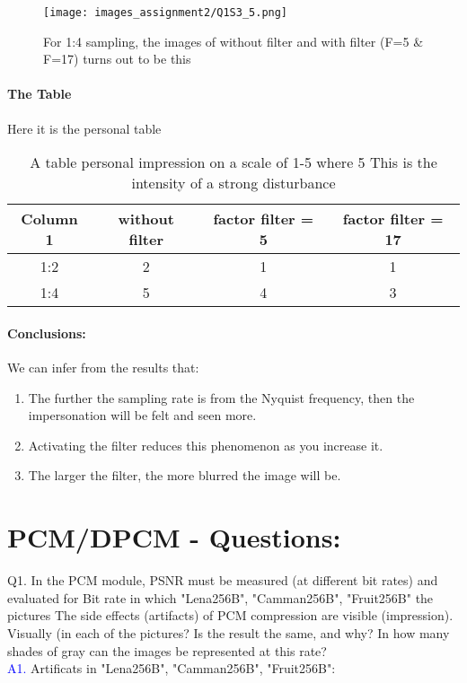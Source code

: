\documentclass[letterpaper, 12pt]{article}
\begin{document}
\begin{figure}[htb]
    \centering
    \texttt{[image: images\_assignment2/Q1S3\_5.png]}
    \caption{For 1:4 sampling, the images of without filter and with filter (F=5 \& F=17) turns out to be this}
    
\end{figure}
\newpage
\paragraph{The Table}
Here it is the personal table
\begin{table}[htb] 
    \centering
    \begin{tabular}{|c|c|c|c|}
    \hline
    Column 1 & without filter& factor filter = 5& factor filter = 17\\
    \hline
    1:2& 2& 1& 1\\
    1:4& 5& 4& 3\\
    \end{tabular}
    \caption{A table personal impression on a scale of 1-5 where 5 This is the intensity of a strong disturbance}
    \label{tab:my_table}
\end{table}
\paragraph{Conclusions:  } We can infer from the results that: \\
\begin{enumerate}
    \item The further the sampling rate is from the Nyquist frequency, then the impersonation will be felt and seen more. 
    \item Activating the filter reduces this phenomenon as you increase it. 
    \item The larger the filter, the more blurred the image will be.  
\end{enumerate}
\newpage

\section{PCM/DPCM - Questions:}
Q1. In the PCM module, PSNR must be measured (at different bit rates) and evaluated for
  Bit rate in which "Lena256B", "Camman256B", "Fruit256B" the pictures The side effects (artifacts) of PCM compression are visible (impression).\\
Visually (in each of the pictures?
Is the result the same, and why? In how many shades of gray can the images be represented at this rate? \\
\textcolor{blue}{A1.} Artificats in "Lena256B", "Camman256B", "Fruit256B": 
\end{document}
